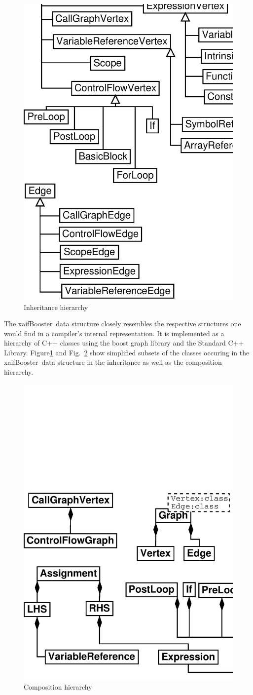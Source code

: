\documentclass[11pt]{article}
\newcommand{\xaifBooster}{xaifBooster}
\newcommand{\reffig}[1]{{Fig.~\ref{#1}}}
\newcommand{\reffigBS}[1]{{Figure\ref{#1}}}
\begin{document}
\begin{figure}
\centering \includegraphics[width=.45\textwidth]{irInh}
\caption{Inheritance hierarchy} \label{fig:iri}
\end{figure}

The \xaifBooster\ data structure  
closely resembles the respective structures one would find in a 
compiler's internal representation. 
It is implemented as a hierarchy of C++ classes 
using the boost graph library \cite{boostWeb}
and the Standard C++ Library\cite{libstdcWeb}.
\reffigBS{fig:iri} and \reffig{fig:irc} show simplified subsets of the classes 
occuring in the \xaifBooster\ data structure in the inheritance 
as well as the composition hierarchy.  
\begin{figure}[htb]
\centering \includegraphics[width=.45\textwidth]{irComp}
\caption{Composition hierarchy} \label{fig:irc}
\end{figure}
\end{document}
